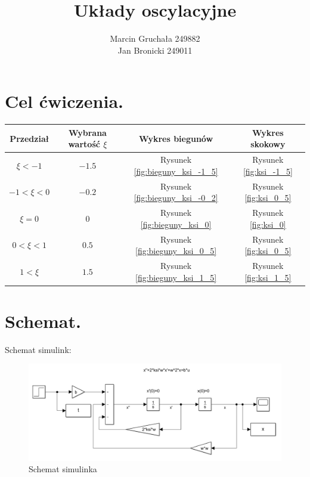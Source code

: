 \documentclass{article}
\title{Układy oscylacyjne}
\author{Marcin Gruchała 249882\\Jan Bronicki 249011\\}
\date{}
\begin{document}
\maketitle

\section{Cel ćwiczenia.}





\begin{center}
\begin{tabular}{ |c|c|c|c| }
    \hline
    Przedział & Wybrana wartość $\xi$ & Wykres biegunów & Wykres skokowy \\ 
    \hline
    $\xi<-1$    & $-1.5$ & Rysunek \ref{fig:bieguny_ksi_-1_5}   & Rysunek \ref{fig:ksi_-1_5}\\
    \hline
    $-1<\xi<0$  & $-0.2$ & Rysunek \ref{fig:bieguny_ksi_-0_2}   & Rysunek \ref{fig:ksi_0_5}\\ 
    \hline
    $\xi=0$     & $0$    & Rysunek \ref{fig:bieguny_ksi_0}      & Rysunek \ref{fig:ksi_0}\\ 
    \hline
    $0<\xi<1$   & $0.5$  & Rysunek \ref{fig:bieguny_ksi_0_5}    & Rysunek \ref{fig:ksi_0_5}\\ 
    \hline
    $1<\xi$     & $1.5$  & Rysunek \ref{fig:bieguny_ksi_1_5}    & Rysunek \ref{fig:ksi_1_5}\\ 
    \hline
\end{tabular}
\end{center}




\section{Schemat.}
Schemat simulink:\\
 \begin{figure}[h!]
    \centering
    \includegraphics[scale=0.6]{schemat.png}
    \caption{Schemat simulinka}
    \label{fig:schemat}
 \end{figure}
 
\end{document}
